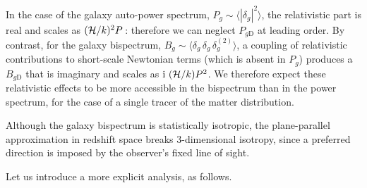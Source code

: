 In the case of the galaxy {auto}-power spectrum, $P_g\sim \langle |\delta_g|^2\rangle$, the relativistic part is {real and scales as} $(\mathcal{H}/k)^2P$\,:  therefore we can neglect $P_{g\mathrm{D}}$ at leading order. By contrast, for the galaxy bispectrum, $B_g\sim \langle \delta_g\,\delta_g \, \delta^{(2)}_g\rangle$, a coupling of relativistic contributions to short-scale Newtonian terms (which  is absent in $P_g$) produces a $B_{g\mathrm{D}}$ that is {imaginary and scales as} ${\mathrm{i\,}}\,(\mathcal{H}/k)P^2$. 
We therefore expect these relativistic effects to be more accessible in the bispectrum than in the power spectrum, for the case of a single tracer {of the matter distribution}.

Although the galaxy bispectrum is statistically isotropic, the plane-parallel approximation in redshift space breaks 3-dimensional isotropy, since a preferred direction is imposed by the observer's fixed line of sight. 

Let us introduce a more explicit analysis, as follows.

